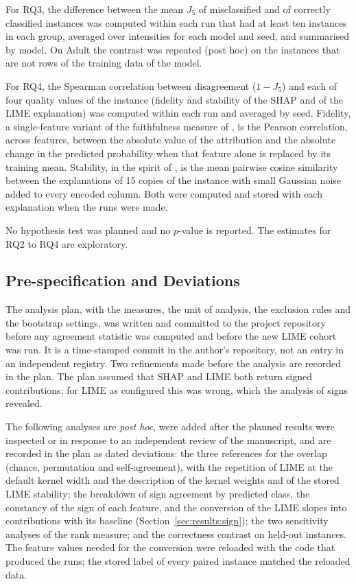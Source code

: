 \documentclass{cys}
\newif\iffull
\begin{document}
For RQ3, the difference between the mean $J_5$ of misclassified and of correctly
classified instances was computed within each run that had at least ten instances in
each group, averaged over intensities for each model and seed, and summarised by model.
On Adult the contrast was repeated (post hoc) on the instances that are not rows of the
training data of the model.

For RQ4, the Spearman correlation between disagreement ($1 - J_5$) and each of four
quality values of the instance (fidelity and stability of the SHAP and of the LIME
explanation) was computed within each run and averaged by seed. Fidelity, a single-feature variant of the faithfulness measure of
\cite{bhatt2020evaluating}, is the Pearson correlation, across features, between the
absolute value of the attribution and the absolute change in the predicted probability
when that feature alone is replaced by its training mean. Stability, in the spirit of \cite{alvarezmelis2018robustness}, is the mean pairwise
cosine similarity between the explanations of 15 copies of the instance with small
Gaussian noise added to every encoded column. Both were
computed and stored with each explanation when the runs were made.

No hypothesis test was planned and no $p$-value is reported. The estimates for RQ2 to RQ4
are exploratory.

\subsection{Pre-specification and Deviations}

The analysis plan, with the measures, the unit of analysis, the exclusion rules and the
bootstrap settings, was written and committed to the project repository before any
agreement statistic was computed and before the new LIME cohort was run. It is a
time-stamped commit in the author's repository\iffull{} (\texttt{7726bb0a9})\fi, not an entry in an independent registry.
Two refinements made before the analysis are recorded in the plan. The plan assumed that
SHAP and LIME both return signed contributions; for LIME as configured this was wrong,
which the analysis of signs revealed.

The following analyses are \emph{post hoc}, were added after the planned results were
inspected or in response to an independent review of the manuscript, and are recorded in
the plan as dated deviations: the three references for the overlap (chance, permutation
and self-agreement), with the repetition of LIME at the default kernel width and the
description of the kernel weights and of the stored LIME stability; the breakdown of sign agreement by predicted class, the constancy of the
sign of each feature, and the conversion of the LIME slopes into contributions with its
baseline (Section~\ref{sec:results:sign}); the two sensitivity analyses of the rank
measure; and the correctness contrast on held-out instances. The feature values needed for
the conversion were reloaded with the code that produced the runs; the stored label of
every paired instance matched the reloaded data.
\end{document}
